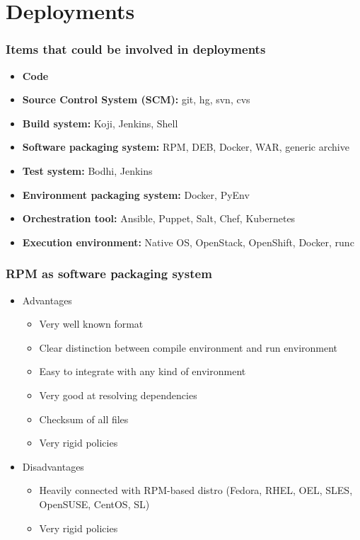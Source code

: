 \documentclass[t,aspectratio=169]{beamer}
\begin{document}
\section{Deployments}
\begin{frame}
    \frametitle{Items that could be involved in deployments}
    \begin{itemize}
        \item<2-> \textbf{Code}
        \item<3-> \textbf{Source Control System (SCM):} git, hg, svn, cvs
        \item<4-> \textbf{Build system:} Koji, Jenkins, Shell
        \item<5-> \textbf{Software packaging system:} RPM, DEB, Docker, WAR, generic archive
        \item<6-> \textbf{Test system:} Bodhi, Jenkins
        \item<7-> \textbf{Environment packaging system:} Docker, PyEnv
        \item<8-> \textbf{Orchestration tool:} Ansible, Puppet, Salt, Chef, Kubernetes
        \item<9-> \textbf{Execution environment:} Native OS, OpenStack, OpenShift, Docker, runc
    \end{itemize}
\end{frame}

\begin{frame}
    \frametitle{RPM as software packaging system}
    \begin{itemize}
        \item<2-> Advantages
        \begin{itemize}
            \item<3-> Very well known format
            \item<4-> Clear distinction between compile environment and run environment
            \item<5-> Easy to integrate with any kind of environment
            \item<6-> Very good at resolving dependencies
            \item<7-> Checksum of all files
            \item<8-> Very rigid policies
        \end{itemize}
        \item<9-> Disadvantages
        \begin{itemize}
            \item<10-> Heavily connected with RPM-based distro (Fedora, RHEL, OEL, SLES, OpenSUSE, CentOS, SL)
            \item<11-> Very rigid policies
        \end{itemize}
    \end{itemize}
\end{frame}
\end{document}
